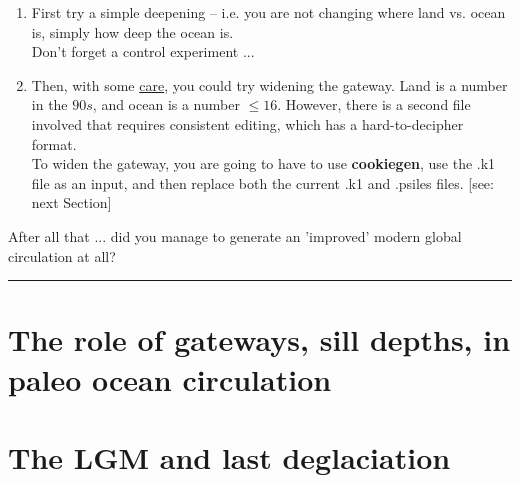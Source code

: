 \begin{enumerate}[noitemsep]
\begin{enumerate}[noitemsep]
\newpage

\vspace{1mm}
\begin{enumerate}[noitemsep]
\item First try a simple deepening -- i.e. you are not changing where land vs. ocean is, simply how deep the ocean is.
\\Don't forget a control experiment ...
\item Then, with some \uline{care}, you could try widening the gateway. Land is a number in the \(90s\), and ocean is a number \(\leqslant16\). However, there is a second file involved that requires consistent editing, which has a hard-to-decipher format.
\\To widen the gateway, you are going to have to use \textbf{cookiegen}, use the \textsf{\footnotesize .k1} file as an input, and then replace both the current \textsf{\footnotesize .k1} and \textsf{\footnotesize .psiles} files. [see: next Section]
\end{enumerate}
 
\end{enumerate}
 
\end{enumerate}

\vspace{2mm}
After all that ... did you manage to generate an 'improved' modern global circulation at all?

\vspace{1mm}\noindent\rule{4cm}{0.5pt}\vspace{2mm}

\newpage

\section{The role of gateways, sill depths, in paleo ocean circulation}







\newpage

\section{The LGM and last deglaciation}

